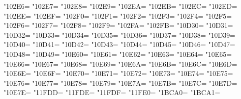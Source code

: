 \XeTeXcharclass"102E6=\KclassNum
\XeTeXcharclass"102E7=\KclassNum
\XeTeXcharclass"102E8=\KclassNum
\XeTeXcharclass"102E9=\KclassNum
\XeTeXcharclass"102EA=\KclassNum
\XeTeXcharclass"102EB=\KclassNum
\XeTeXcharclass"102EC=\KclassNum
\XeTeXcharclass"102ED=\KclassNum
\XeTeXcharclass"102EE=\KclassNum
\XeTeXcharclass"102EF=\KclassNum
\XeTeXcharclass"102F0=\KclassNum
\XeTeXcharclass"102F1=\KclassNum
\XeTeXcharclass"102F2=\KclassNum
\XeTeXcharclass"102F3=\KclassNum
\XeTeXcharclass"102F4=\KclassNum
\XeTeXcharclass"102F5=\KclassNum
\XeTeXcharclass"102F6=\KclassNum
\XeTeXcharclass"102F7=\KclassNum
\XeTeXcharclass"102F8=\KclassNum
\XeTeXcharclass"102F9=\KclassNum
\XeTeXcharclass"102FA=\KclassNum
\XeTeXcharclass"102FB=\KclassNum
\XeTeXcharclass"10D30=\KclassNum
\XeTeXcharclass"10D31=\KclassNum
\XeTeXcharclass"10D32=\KclassNum
\XeTeXcharclass"10D33=\KclassNum
\XeTeXcharclass"10D34=\KclassNum
\XeTeXcharclass"10D35=\KclassNum
\XeTeXcharclass"10D36=\KclassNum
\XeTeXcharclass"10D37=\KclassNum
\XeTeXcharclass"10D38=\KclassNum
\XeTeXcharclass"10D39=\KclassNum
\XeTeXcharclass"10D40=\KclassNum
\XeTeXcharclass"10D41=\KclassNum
\XeTeXcharclass"10D42=\KclassNum
\XeTeXcharclass"10D43=\KclassNum
\XeTeXcharclass"10D44=\KclassNum
\XeTeXcharclass"10D45=\KclassNum
\XeTeXcharclass"10D46=\KclassNum
\XeTeXcharclass"10D47=\KclassNum
\XeTeXcharclass"10D48=\KclassNum
\XeTeXcharclass"10D49=\KclassNum
\XeTeXcharclass"10E60=\KclassNum
\XeTeXcharclass"10E61=\KclassNum
\XeTeXcharclass"10E62=\KclassNum
\XeTeXcharclass"10E63=\KclassNum
\XeTeXcharclass"10E64=\KclassNum
\XeTeXcharclass"10E65=\KclassNum
\XeTeXcharclass"10E66=\KclassNum
\XeTeXcharclass"10E67=\KclassNum
\XeTeXcharclass"10E68=\KclassNum
\XeTeXcharclass"10E69=\KclassNum
\XeTeXcharclass"10E6A=\KclassNum
\XeTeXcharclass"10E6B=\KclassNum
\XeTeXcharclass"10E6C=\KclassNum
\XeTeXcharclass"10E6D=\KclassNum
\XeTeXcharclass"10E6E=\KclassNum
\XeTeXcharclass"10E6F=\KclassNum
\XeTeXcharclass"10E70=\KclassNum
\XeTeXcharclass"10E71=\KclassNum
\XeTeXcharclass"10E72=\KclassNum
\XeTeXcharclass"10E73=\KclassNum
\XeTeXcharclass"10E74=\KclassNum
\XeTeXcharclass"10E75=\KclassNum
\XeTeXcharclass"10E76=\KclassNum
\XeTeXcharclass"10E77=\KclassNum
\XeTeXcharclass"10E78=\KclassNum
\XeTeXcharclass"10E79=\KclassNum
\XeTeXcharclass"10E7A=\KclassNum
\XeTeXcharclass"10E7B=\KclassNum
\XeTeXcharclass"10E7C=\KclassNum
\XeTeXcharclass"10E7D=\KclassNum
\XeTeXcharclass"10E7E=\KclassNum
\XeTeXcharclass"11FDD=\KclassNum
\XeTeXcharclass"11FDE=\KclassNum
\XeTeXcharclass"11FDF=\KclassNum
\XeTeXcharclass"11FE0=\KclassNum
\XeTeXcharclass"1BCA0=\KclassNum
\XeTeXcharclass"1BCA1=\KclassNum

